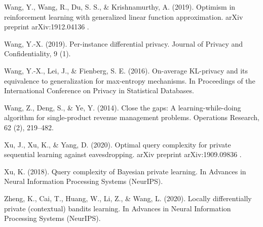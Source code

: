 Wang, Y., Wang, R., Du, S. S., \& Krishnamurthy, A. (2019). Optimism in reinforcement learning with generalized linear function approximation. arXiv preprint arXiv:1912.04136 .

Wang, Y.-X. (2019). Per-instance differential privacy. Journal of Privacy and Confidentiality, 9 (1).

Wang, Y.-X., Lei, J., \& Fienberg, S. E. (2016). On-average KL-privacy and its equivalence to generalization for max-entropy mechanisms. In Proceedings of the International Conference on Privacy in Statistical Databases.

Wang, Z., Deng, S., \& Ye, Y. (2014). Close the gaps: A learning-while-doing algorithm for single-product revenue management problems. Operations Research, 62 (2), 219--482.

Xu, J., Xu, K., \& Yang, D. (2020). Optimal query complexity for private sequential learning against eavesdropping. arXiv preprint arXiv:1909.09836 .

Xu, K. (2018). Query complexity of Bayesian private learning. In Advances in Neural Information Processing Systems (NeurIPS).

Zheng, K., Cai, T., Huang, W., Li, Z., \& Wang, L. (2020). Locally differentially private (contextual) bandits learning. In Advances in Neural Information Processing Systems (NeurIPS).


